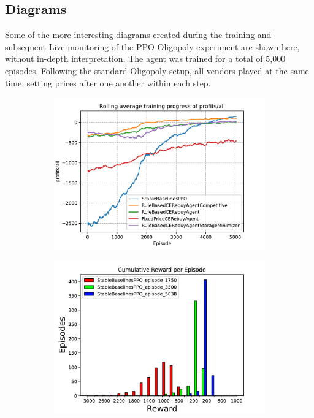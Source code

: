 \clearpage
\subsection{Diagrams}\label{subsec:AppendixOligopolyDiagrams}

Some of the more interesting diagrams created during the training and subsequent Live-monitoring of the PPO-Oligopoly experiment are shown here, without in-depth interpretation. The agent was trained for a total of 5,000 episodes. Following the standard Oligopoly setup, all vendors played at the same time, setting prices after one another within each step.

\begin{figure}[ht]
	\centering
	\begin{subfigure}[t]{0.49\textwidth}
		\centering
		\includegraphics[width = \textwidth]{images/experiments/PPOOligopoly/PPOOligopolyLineProfitsAll.pdf}\\
		\label{fig:PPOOligopolyLineProfitsAll}
	\end{subfigure}
	\begin{subfigure}[t]{0.49\textwidth}
		\centering
		\includegraphics[width = \textwidth]{images/experiments/PPOOligopoly/PPOOligopolyCumulativeRewards.pdf}\\

\end{subfigure}
\end{figure}
